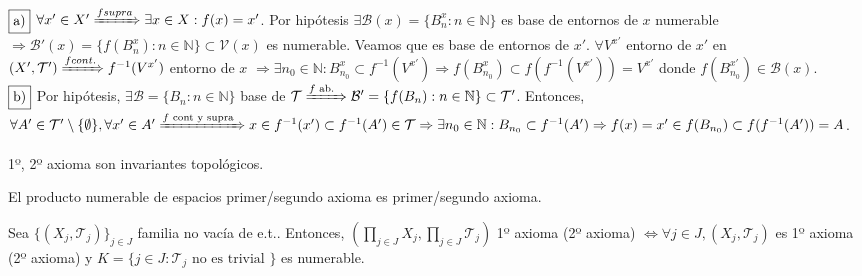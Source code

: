 \begin{dem}
  $\fbox{a)}$ $\forall x' \in X' \xRightarrow[]{ f supra} \exists x \in X : f(x) = x'$. Por hipótesis $\exists \mathcal{B} (x) = \{ B_{n}^{x} : n \in \mathbb{N} \}$ es base de entornos de $x$ numerable $\Rightarrow \mathcal{B}'(x) = \{ f(B_{n}^{x}) : n \in \mathbb{N} \} \subset \mathcal{V}(x)$ es numerable. Veamos que es base de entornos de $x'$. $\forall V^{x'}$ entorno de $ x'$ en $( X', \mathcal{T}' ) \xRightarrow[]{ f cont. } f^{-1}(V^{x'})$ entorno de $x$ $\Rightarrow \exists n_{0} \in \mathbb{N} : B_{n_{0}}^{x} \subset f^{-1}(V^{x'}) \Rightarrow f(B_{n_{0}}^{x}) \subset f(f^{-1}(V^{x'})) = V^{x'}$ donde $ f(B_{n_{0}}^{x'}) \in \mathcal{B}(x)$. \\

$\fbox{b)}$ Por hipótesis, $\exists \mathcal{B} = \{ B_{n} : n \in \mathbb{N} \}$ base de $\mathcal{T} \xRightarrow[]{f \text{ ab. }} \mathcal{B}' = \{  f(B_{n}) : n \in \mathbb{N} \} \subset \mathcal{T}'$. Entonces, $\forall A' \in \mathcal{T}' \setminus \{  \emptyset \}, \forall x' \in A' \xRightarrow[]{f \text{ cont y supra }} x \in f^{-1}(x') \subset f^{-1}(A') \in \mathcal{T} \Rightarrow \exists n_{0} \in \mathbb{N} : B_{n_{0}} \subset f^{-1}(A') \Rightarrow f(x) = x' \in f(B_{n_{0}}) \subset f( f^{-1}(A')) = A$.
\end{dem}

\begin{cor}
  1º, 2º axioma son invariantes topológicos.
\end{cor}

\begin{obs}
  El producto numerable de espacios primer/segundo axioma es primer/segundo axioma.
\end{obs}

\begin{prop}
  Sea $\{ ( X_{j}, \mathcal{T}_{j} ) \}_{j \in J}$ familia no vacía de e.t.. Entonces, $( \prod_{j \in J} X_{j}, \prod_{j \in J} \mathcal{T}_{j} )$ 1º axioma (2º axioma) $\Leftrightarrow \forall j \in J, ( X_{j}, \mathcal{T}_{j} )$ es 1º axioma (2º axioma) y $K = \{ j \in J: \mathcal{T}_{j} \text{ no es trivial } \}$ es numerable.
\end{prop}

